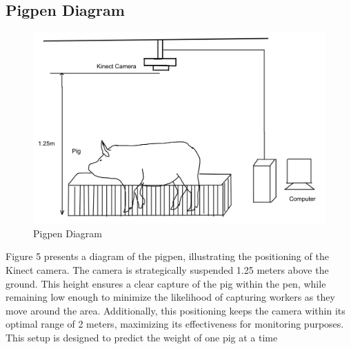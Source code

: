 {\subsection {Pigpen Diagram}

\begin{figure}[h]
	\centering
	\includegraphics[height=0.4\textheight]{figures/Untitled-1wqw}
	\caption{Pigpen Diagram}
	\label{fig:Pigpen Diagram}
\end{figure}

Figure 5 presents a diagram of the pigpen, illustrating the positioning of the Kinect camera. The camera is strategically suspended 1.25 meters above the ground. This height ensures a clear capture of the pig within the pen, while remaining low enough to minimize the likelihood of capturing workers as they move around the area. Additionally, this positioning keeps the camera within its optimal range of 2 meters, maximizing its effectiveness for monitoring purposes. This setup is designed to predict the weight of one pig at a time

}
